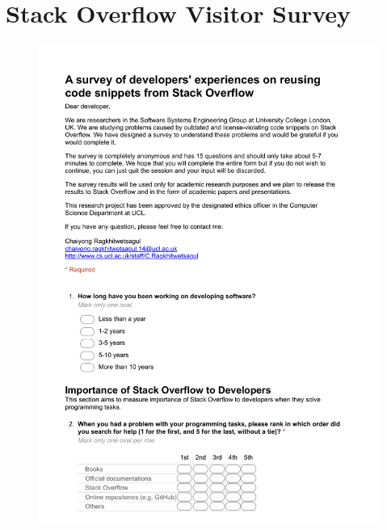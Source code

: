 \documentclass{svjour3}                     %
\begin{document}
\section{Stack Overflow Visitor Survey}\label{appendixB}
\begin{figure}[H]
	\centering
	\includegraphics[width=0.85\linewidth]{visitor-1}
	\label{fig:visitor-1}
\end{figure}
\end{document}
